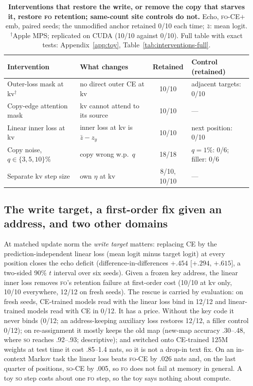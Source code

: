 \documentclass[11pt]{article}
\newcommand{\FO}{\textsc{fo}}
\newcommand{\SO}{\textsc{so}}
\begin{document}
\begin{table}[t]
\centering
\caption{\textbf{Interventions that restore the write, or remove the copy that starves it, restore
\FO{} retention; same-count site controls do not.} Echo, \FO-CE$+$emb, paired seeds; the unmodified
anchor retained 0/10 each time; $\bar z$: mean logit. $^\dagger$Apple MPS; replicated on CUDA (10/10 against 0/10). Full table with exact tests:
Appendix~\ref{app:toy}, Table~\ref{tab:interventions-full}.}
\label{tab:interventions}
\small
\setlength{\tabcolsep}{4pt}
\begin{tabular}{@{}llcl@{}}
\toprule
Intervention & What changes & Retained & Control (retained) \\
\midrule
Outer-loss mask at kv$^\dagger$ & no direct outer CE at kv & 10/10 & adjacent targets: 0/10 \\
Copy-edge attention mask & kv cannot attend to its source & 10/10 & --- \\
Linear inner loss at kv & inner loss at kv is $\bar z-z_y$ & 10/10 & next position: 0/10 \\
Copy noise, $q\in\{3,5,10\}\%$ & copy wrong w.p.\ $q$ & 18/18 & $q=1\%$: 0/6; filler: 0/6 \\
Separate kv step size & own $\eta$ at kv & 8/10, 10/10 & --- \\
\bottomrule
\end{tabular}
\end{table}

\subsection{The write target, a first-order fix given an address, and two other domains}
\label{sec:toyfix}

At matched update norm the \emph{write target} matters: replacing CE by the prediction-independent
linear loss (mean logit minus target logit) at every position closes the echo deficit
(difference-in-differences $+.454$ [$+.294$, $+.615$], a two-sided 90\% $t$ interval over six
seeds). Given a
frozen key address, the linear inner loss removes \FO's retention failure at first-order cost (10/10
at kv only, 10/10 everywhere, 12/12 on fresh seeds). The rescue is carried by evaluation: on fresh
seeds, CE-trained models read with the linear loss bind in 12/12 and linear-trained models read with
CE in 0/12. It has a price. Without the key code it
never binds (0/12; an address-keeping auxiliary loss restores 12/12, a filler control 0/12); on re-assignment it mostly keeps the old map (new-map accuracy .30--.48, where \SO{} reaches
.92--.93; descriptive); and switched onto CE-trained 125M weights at test time it cost .85--1.4 nats,
so it is not a drop-in text fix. On an in-context Markov task the linear loss beats \FO-CE{} by .026
nats and, on the last quarter of positions, \SO-CE{} by .005, so \FO{} does not fail at memory in
general. A toy \SO{} step costs about one \FO{} step, so the toy says nothing about compute.
\end{document}
